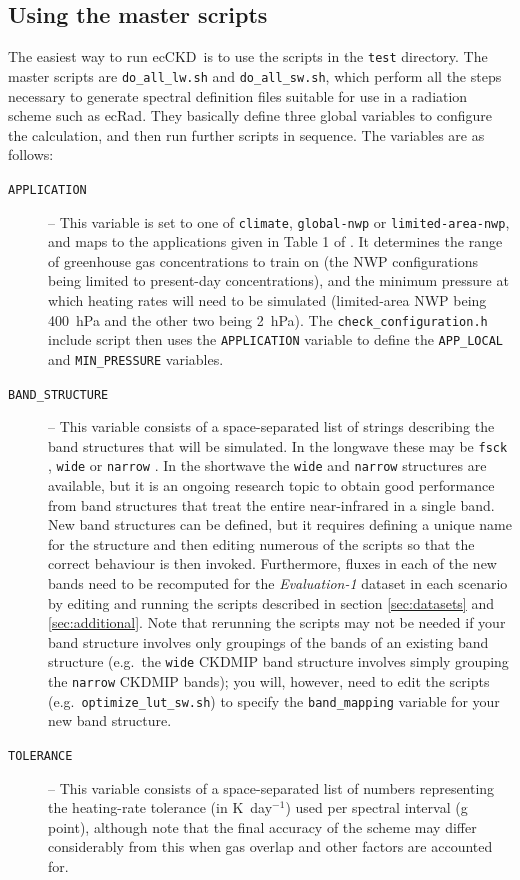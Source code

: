 \documentclass[a4,oneside]{article}
\def\codesize{\small}
\newcommand{\ecckd}{ecCKD}
\def\codesize{\small}
\def\code#1{{\codesize\texttt{#1}}}
\begin{document}
\subsection{Using the master scripts}
\label{sec:master}
The easiest way to run \ecckd\ is to use the scripts in the
\code{test} directory. The master scripts are \code{do\_all\_lw.sh}
and \code{do\_all\_sw.sh}, which perform all the steps necessary to
generate spectral definition files suitable for use in a radiation
scheme such as ecRad. They basically define three global variables to
configure the calculation, and then run further scripts in
sequence. The variables are as follows:
\begin{description}
\item[\code{APPLICATION}] -- This variable is set to one of
  \code{climate}, \code{global-nwp} or \code{limited-area-nwp}, and
  maps to the applications given in Table 1 of \cite{Hogan&2020}. It
  determines the range of greenhouse gas concentrations to train on
  (the NWP configurations being limited to present-day
  concentrations), and the minimum pressure at which heating rates
  will need to be simulated (limited-area NWP being 400~hPa and the
  other two being 2~hPa). The \code{check\_configuration.h} include
  script then uses the \code{APPLICATION} variable to define the
  \code{APP\_LOCAL} and \code{MIN\_PRESSURE} variables.
\item[\code{BAND\_STRUCTURE}] -- This variable consists of a
  space-separated list of strings describing the band structures that
  will be simulated.  In the longwave these may be \code{fsck}
  \citep[the full-spectrum correlated $k$ method described
    by][]{Hogan2010}, \code{wide} or \code{narrow} \citep[the band
    structures proposed by][]{Hogan&2020}. In the shortwave the
  \code{wide} and \code{narrow} structures are available, but it is an
  ongoing research topic to obtain good performance from band
  structures that treat the entire near-infrared in a single band.
  New band structures can be defined, but it requires defining a
  unique name for the structure and then editing numerous of the
  scripts so that the correct behaviour is then invoked. Furthermore,
  fluxes in each of the new bands need to be recomputed for the
  \emph{Evaluation-1} dataset in each scenario by editing and running
  the scripts described in section \ref{sec:datasets} and
  \ref{sec:additional}. Note that rerunning the scripts may not be
  needed if your band structure involves only groupings of the bands
  of an existing band structure (e.g.\ the \code{wide} CKDMIP band
  structure involves simply grouping the \code{narrow} CKDMIP bands);
  you will, however, need to edit the scripts
  (e.g.\ \code{optimize\_lut\_sw.sh}) to specify the
  \code{band\_mapping} variable for your new band structure.
\item[\code{TOLERANCE}] -- This variable consists of a space-separated
  list of numbers representing the heating-rate tolerance (in
  K~day$^{-1}$) used per spectral interval (g point), although note
  that the final accuracy of the scheme may differ considerably from
  this when gas overlap and other factors are accounted for.
\end{description}
\end{document}
